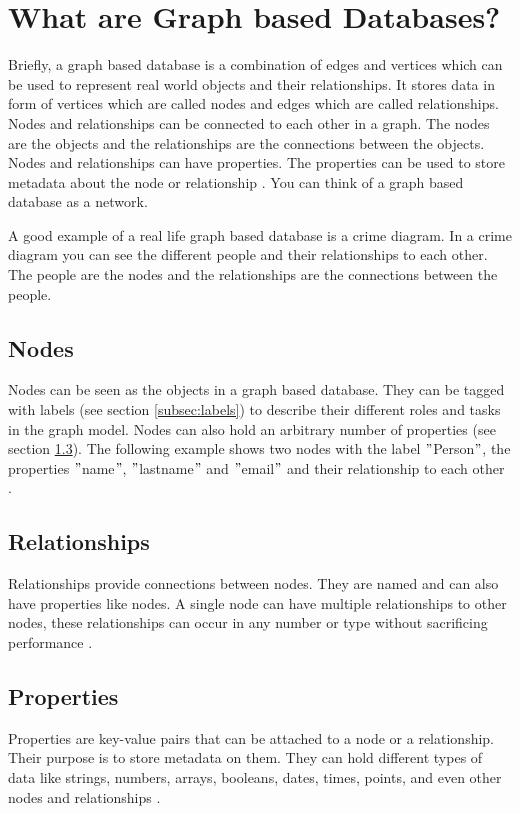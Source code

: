 
\section{What are Graph based Databases?}
Briefly, a graph based database is a combination of edges and vertices which  can be used to represent real world
objects and their relationships.
It stores data in form of vertices which are called nodes and edges which are called relationships.
Nodes and relationships can be connected to each other in a graph.
The nodes are the objects and the relationships are the connections between the objects.
Nodes and relationships can have properties.
The properties can be used to store metadata about the node or relationship \parencite[P. 6f.]{PractivalNeo4j}.
You can think of a graph based database as a network.

A good example of a real life graph based database is a crime diagram.
In a crime diagram you can see the different people and their relationships to each other.
The people are the nodes and the relationships are the connections between the people. \parencite[compare P. 6f.]{BeginningNeo4j}

\subsection{Nodes}
Nodes can be seen as the objects in a graph based database.
They can be tagged with labels (see section \ref{subsec:labels}) to describe their different roles and tasks in the graph model.
Nodes can also hold an arbitrary number of properties (see section \ref{subsec:properties}).
The following example shows two nodes with the label \("\)Person\("\), the properties \("\)name\("\), \("\)lastname\("\)
and \("\)email\("\) and their relationship to each other \parencite[compare P. 6f.]{PractivalNeo4j}.

\subsection{Relationships}\label{subsec:relationships}
Relationships provide connections between nodes.
They are named and can also have properties like nodes.
A single node can have multiple relationships to other nodes, these relationships can occur in any number or type without
sacrificing performance \parencite[compare]{neo4j:allgemeins}.

\subsection{Properties} \label{subsec:properties}
Properties are key-value pairs that can be attached to a node or a relationship.
Their purpose is to store metadata on them.
They can hold different types of data like strings, numbers, arrays, booleans, dates, times, points, and even other nodes and relationships \parencite[compare]{neo4j:Values} \parencite[compare]{neo4j:Graph}.

